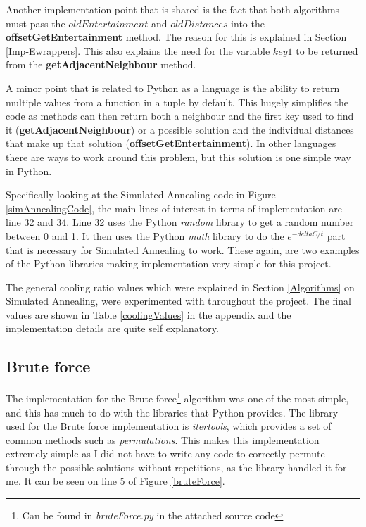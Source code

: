 \documentclass[12pt]{report}
\begin{document}
Another implementation point that is shared is the fact that both algorithms must pass the $oldEntertainment$ and $oldDistances$ into the \textbf{offsetGetEntertainment} method. The reason for this is explained in Section \ref{Imp-Ewrappers}. This also explains the need for the variable $key1$ to be returned from the \textbf{getAdjacentNeighbour} method. 

A minor point that is related to Python as a language is the ability to return multiple values from a function in a tuple by default. This hugely simplifies the code as methods can then return both a neighbour and the first key used to find it (\textbf{getAdjacentNeighbour}) or a possible solution and the individual distances that make up that solution (\textbf{offsetGetEntertainment}). In other languages there are ways to work around this problem, but this solution is one simple way in Python.

Specifically looking at the Simulated Annealing code in Figure \ref{simAnnealingCode}, the main lines of interest in terms of implementation are line 32 and 34. Line 32 uses the Python \textit{random}\cite{PythonRandom} library to get a random number between 0 and 1. It then uses the Python \textit{math}\cite{PythonMath} library to do the $e^{-deltaC/t}$ part that is necessary for Simulated Annealing to work. These again, are two examples of the Python libraries making implementation very simple for this project.

The general cooling ratio values which were explained in Section \ref{Algorithms} on Simulated Annealing, were experimented with throughout the project. The final values are shown in Table \ref{coolingValues} in the appendix and the implementation details are quite self explanatory.

\subsection{Brute force}\label{Imp-Brute}
The implementation for the Brute force\footnote{Can be found in \textit{bruteForce.py} in the attached source code} algorithm was one of the most simple, and this has much to do with the libraries that Python provides. The library used for the Brute force implementation is \textit{itertools}\cite{PythonItertools}, which provides a set of common methods such as \textit{permutations}\cite{PythonPermutations}. This makes this implementation extremely simple as I did not have to write any code to correctly permute through the possible solutions without repetitions, as the library handled it for me. It can be seen on line 5 of Figure \ref{bruteForce}.
\end{document}
